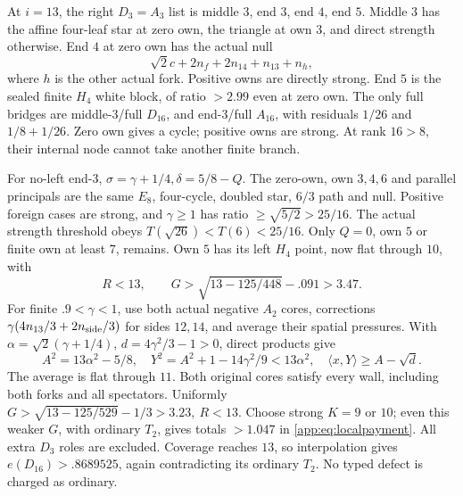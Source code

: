 \documentclass[11pt]{article}
\theoremstyle{definition}
\theoremstyle{remark}
\newcommand{\ip}[2]{\langle #1,#2\rangle}
\begin{document}
At \(i=13\), the right \(D_3=A_3\) list is
middle \(3\), end \(3\), end \(4\), end \(5\).
Middle \(3\) has the affine four-leaf star
at zero own, the triangle at own \(3\),
and direct strength otherwise.
End \(4\) at zero own has the actual null
\[
 \sqrt2c+2n_f+2n_{14}+n_{13}+n_h,
\]
where \(h\) is the other actual fork.
Positive owns are directly strong.
End \(5\) is the sealed finite \(H_4\)
white block, of ratio \(>2.99\) even at
zero own.
The only full bridges are middle-\(3\)/full
\(D_{16}\), and end-\(3\)/full \(A_{16}\),
with residuals \(1/26\) and \(1/8+1/26\).
Zero own gives a cycle; positive owns are
strong. At rank \(16>8\), their internal
node cannot take another finite branch.

For no-left end-\(3\),
\(\sigma=\gamma+1/4,\delta=5/8-Q\).
The zero-own, own \(3,4,6\) and parallel
principals are the same \(E_8\), four-cycle,
doubled star, \(6/3\) path and null.
Positive foreign cases are strong, and
\(\gamma\geq1\) has ratio
\(\geq\sqrt{5/2}>25/16\).
The actual strength threshold obeys
\(T(\sqrt{26})<T(6)<25/16\).
Only \(Q=0\), own \(5\) or finite own
at least \(7\), remains.
Own \(5\) has its left \(H_4\) point,
now flat through \(10\), with
\[
 R<13,\qquad
 G>\sqrt{13-125/448}-.091>3.47.
\]
For finite \(.9<\gamma<1\), use both
actual negative \(A_2\) cores, corrections
\(\gamma(4n_{13}/3+2n_{\rm side}/3)\)
for sides \(12,14\), and average their
spatial pressures. With
\(\alpha=\sqrt2(\gamma+1/4)\),
\(d=4\gamma^2/3-1>0\), direct products give
\[
 A^2=13\alpha^2-5/8,\quad
 Y^2=A^2+1-14\gamma^2/9<13\alpha^2,\quad
 \ip{x}{Y}\geq A-\sqrt d.
\]
The average is flat through \(11\).
Both original cores satisfy every wall,
including both forks and all spectators.
Uniformly
\(G>\sqrt{13-125/529}-1/3>3.23,\ R<13\).
Choose strong \(K=9\) or \(10\);
even this weaker \(G\), with ordinary
\(T_2\), gives totals \(>1.047\) in
\eqref{app:eq:localpayment}.
All extra \(D_3\) roles are excluded.
Coverage reaches \(13\), so interpolation
gives \(e(D_{16})>.8689525\), again
contradicting its ordinary \(T_2\).
No typed defect is charged as ordinary.
\end{document}
